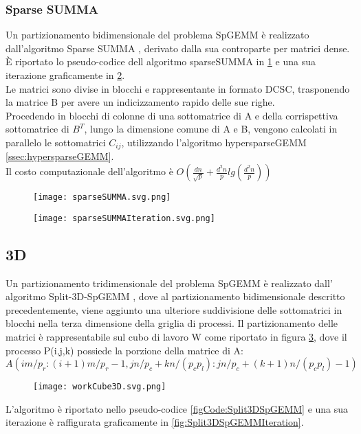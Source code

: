 \subsubsection{Sparse SUMMA}
Un partizionamento bidimensionale del problema SpGEMM è realizzato
dall'algoritmo Sparse SUMMA \parencite{sparseSUMMA}, derivato dalla sua
controparte per matrici dense.\\
È riportato lo pseudo-codice dell algoritmo sparseSUMMA 
in \ref{figCode:sparseSUMMA} e una sua iterazione graficamente in
\ref{fig:sparseSUMMAIteration}.\\
Le matrici sono divise in blocchi e rappresentante in formato DCSC,
trasponendo la matrice B per avere un indicizzamento rapido delle sue righe.\\
Procedendo in blocchi di colonne di una sottomatrice di A e della corrispettiva
sottomatrice di $B^T$, lungo la dimensione comune di A e B,
vengono calcolati in parallelo le sottomatrici $C_{ij}$, 
utilizzando l'algoritmo hypersparseGEMM \ref{ssec:hypersparseGEMM}.\\
Il costo computazionale dell'algoritmo è 
$O(\frac{dn}{\sqrt{p}}+\frac{d^2n}{p}lg(\frac{d^2n}{p}))$
\begin{figure}[h]
  \caption[SparseSUMMA, per una risoluzione parallela di SpGEMM con un partizionamento 2D]
  \centering \texttt{[image: sparseSUMMA.svg.png]} \decoRule \label{figCode:sparseSUMMA}
\end{figure}
\begin{figure}[h]
  \caption[esecuzione di un iterazione dell'algoritmo sparseSUMMA]
  \centering \texttt{[image: sparseSUMMAIteration.svg.png]} \decoRule \label{fig:sparseSUMMAIteration}
\end{figure}

\subsection{3D}
Un partizionamento tridimensionale del problema SpGEMM è realizzato dall'
algoritmo Split-3D-SpGEMM \parencite{Split3DSpGEMM}, dove al partizionamento
bidimensionale descritto precedentemente, viene aggiunto una ulteriore
suddivisione delle sottomatrici in blocchi nella terza dimensione della griglia di processi.
Il partizionamento delle matrici è rappresentabile sul cubo di lavoro W come
riportato in figura \ref{fig:workCube3D}, dove il processo P(i,j,k) possiede la
porzione della matrice di A: 
$A(im/p_r:(i+1)m/p_r - 1, jn/p_c + kn/(p_c p_l ) : jn/p_c + (k + 1)n/(p_c p_l) - 1)$  \\
\begin{figure}[h]
  \caption[rappresentazione 3D della suddivisione della computazione SpGEMM]
  \centering \texttt{[image: workCube3D.svg.png]} \decoRule \label{fig:workCube3D}
\end{figure}
L'algoritmo è riportato nello pseudo-codice \ref{figCode:Split3DSpGEMM} e una
sua iterazione è raffigurata graficamente in \ref{fig:Split3DSpGEMMIteration}.\\

